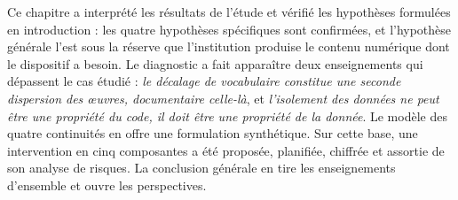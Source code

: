 \conclchap

Ce chapitre a interprété les résultats de l'étude et vérifié les hypothèses
formulées en introduction : les quatre hypothèses spécifiques sont confirmées,
et l'hypothèse générale l'est sous la réserve que l'institution produise le
contenu numérique dont le dispositif a besoin. Le diagnostic a fait apparaître
deux enseignements qui dépassent le cas étudié : \emph{le décalage de
vocabulaire constitue une seconde dispersion des œuvres, documentaire celle-là},
et \emph{l'isolement des données ne peut être une propriété du code, il doit
être une propriété de la donnée}. Le modèle des quatre continuités en offre une
formulation synthétique. Sur cette base, une intervention en cinq composantes a
été proposée, planifiée, chiffrée et assortie de son analyse de risques. La
conclusion générale en tire les enseignements d'ensemble et ouvre les
perspectives.

